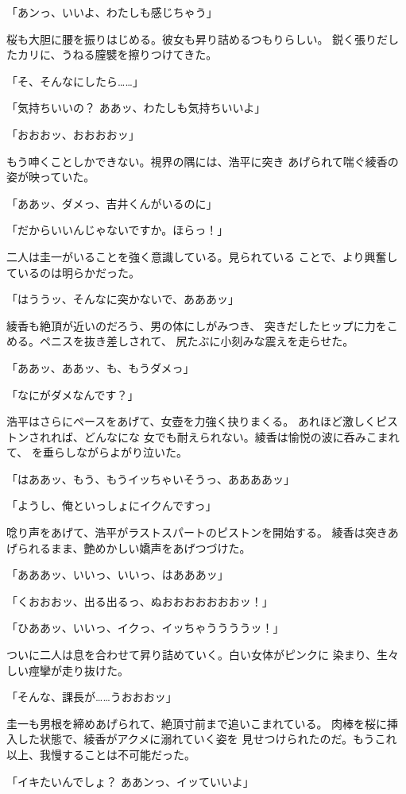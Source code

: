 ﻿\documentclass[
    book,tate,
    line_length=30zw,
    jafontsize=12pt,
    paper=b5j,
    landscape,
    ]{jlreq}
\begin{document}
「あンっ、いいよ、わたしも感じちゃう」

桜も大胆に腰を振りはじめる。彼女も昇り詰めるつもりらしい。
鋭く張りだしたカリに、うねる膣襞を擦りつけてきた。

「そ、そんなにしたら……」

「気持ちいいの？ ああッ、わたしも気持ちいいよ」

「おおおッ、おおおおッ」

もう呻くことしかできない。視界の隅には、浩平に突き
あげられて喘ぐ綾香の姿が映っていた。

「ああッ、ダメっ、吉井くんがいるのに」

「だからいいんじゃないですか。ほらっ！」

二人は圭一がいることを強く意識している。見られている
ことで、より興奮しているのは明らかだった。

「はううッ、そんなに突かないで、あああッ」

綾香も絶頂が近いのだろう、男の体にしがみつき、
突きだしたヒップに力をこめる。ペニスを抜き差しされて、
尻たぶに小刻みな震えを走らせた。

「ああッ、ああッ、も、もうダメっ」

「なにがダメなんです？」

浩平はさらにペースをあげて、女壺を力強く抉りまくる。
あれほど激しくピストンされれば、どんなにな
女でも耐えられない。綾香は愉悦の波に呑みこまれて、
を垂らしながらよがり泣いた。

「はああッ、もう、もうイッちゃいそうっ、ああああッ」

「ようし、俺といっしょにイクんですっ」

唸り声をあげて、浩平がラストスパートのピストンを開始する。
綾香は突きあげられるまま、艶めかしい嬌声をあげつづけた。

「あああッ、いいっ、いいっ、はあああッ」

「くおおおッ、出る出るっ、ぬおおおおおおおッ！」

「ひああッ、いいっ、イクっ、イッちゃううううッ！」

ついに二人は息を合わせて昇り詰めていく。白い女体がピンクに
染まり、生々しい痙攣が走り抜けた。

「そんな、課長が……うおおおッ」

圭一も男根を締めあげられて、絶頂寸前まで追いこまれている。
肉棒を桜に挿入した状態で、綾香がアクメに溺れていく姿を
見せつけられたのだ。もうこれ以上、我慢することは不可能だった。

「イキたいんでしょ？ ああンっ、イッていいよ」
\end{document}
